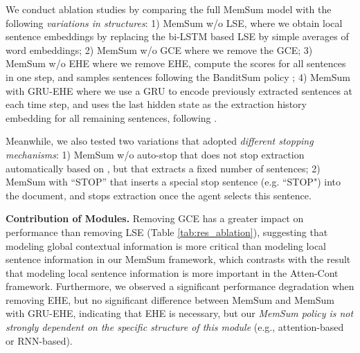 \documentclass[11pt]{article}
\begin{document}
\begin{table}
\centering
{}
\caption{ \label{tab:res_ablation} Ablation study on the PubMed dataset. } 

\end{table}
We conduct ablation studies by comparing the full MemSum model with the following \textit{variations in structures}: 1) MemSum w/o LSE, where we obtain local sentence embeddings by replacing the bi-LSTM based LSE by simple averages of word embeddings; 2) MemSum w/o GCE where we remove the GCE; 3) MemSum w/o EHE where we remove EHE, compute the scores for all sentences in one step, and samples sentences following the BanditSum policy \cite{dong2018banditsum}; 4) MemSum with GRU-EHE where we use a GRU to encode previously extracted sentences at each time step, and uses the last hidden state as the extraction history embedding for all remaining sentences, following  \citet{zhou-etal-2018-neural-document}.  

Meanwhile, we also tested two variations that adopted \textit{different stopping mechanisms}:  1) MemSum w/o auto-stop that does not stop extraction automatically based on , but that extracts a fixed number of sentences; 2) MemSum with ``STOP'' that inserts a  special  stop sentence  (e.g.   “STOP")  into  the document, and stops extraction once the agent selects this sentence.


\noindent\textbf{Contribution of Modules.} 
Removing GCE has a greater impact on performance than removing LSE (Table \ref{tab:res_ablation}), suggesting that modeling global contextual information is more critical than modeling local sentence information in our MemSum framework, which contrasts with the result that modeling local sentence information is more important in the Atten-Cont \cite{xiao-carenini-2019-extractive} framework. Furthermore, we observed a significant performance degradation when removing EHE, but no significant difference between MemSum and MemSum with GRU-EHE, indicating that EHE is necessary, but our \textit{MemSum policy is not strongly dependent on the specific structure of this module} (e.g., attention-based or RNN-based). 
\end{document}
